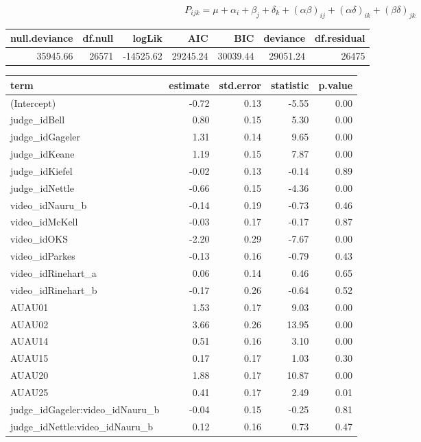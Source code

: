 \documentclass{monashthesis}
\begin{document}
\[P_{ijk} = \mu + \alpha_i + \beta_j +\delta_k + (\alpha\beta)_{ij}+(\alpha\delta)_{ik} + (\beta\delta)_{jk}\]

\begin{tabular}{r|r|r|r|r|r|r}
\hline
null.deviance & df.null & logLik & AIC & BIC & deviance & df.residual\\
\hline
35945.66 & 26571 & -14525.62 & 29245.24 & 30039.44 & 29051.24 & 26475\\
\hline
\end{tabular}

\begin{tabular}{l|r|r|r|r}
\hline
term & estimate & std.error & statistic & p.value\\
\hline
(Intercept) & -0.72 & 0.13 & -5.55 & 0.00\\
\hline
judge\_idBell & 0.80 & 0.15 & 5.30 & 0.00\\
\hline
judge\_idGageler & 1.31 & 0.14 & 9.65 & 0.00\\
\hline
judge\_idKeane & 1.19 & 0.15 & 7.87 & 0.00\\
\hline
judge\_idKiefel & -0.02 & 0.13 & -0.14 & 0.89\\
\hline
judge\_idNettle & -0.66 & 0.15 & -4.36 & 0.00\\
\hline
video\_idNauru\_b & -0.14 & 0.19 & -0.73 & 0.46\\
\hline
video\_idMcKell & -0.03 & 0.17 & -0.17 & 0.87\\
\hline
video\_idOKS & -2.20 & 0.29 & -7.67 & 0.00\\
\hline
video\_idParkes & -0.13 & 0.16 & -0.79 & 0.43\\
\hline
video\_idRinehart\_a & 0.06 & 0.14 & 0.46 & 0.65\\
\hline
video\_idRinehart\_b & -0.17 & 0.26 & -0.64 & 0.52\\
\hline
AUAU01 & 1.53 & 0.17 & 9.03 & 0.00\\
\hline
AUAU02 & 3.66 & 0.26 & 13.95 & 0.00\\
\hline
AUAU14 & 0.51 & 0.16 & 3.10 & 0.00\\
\hline
AUAU15 & 0.17 & 0.17 & 1.03 & 0.30\\
\hline
AUAU20 & 1.88 & 0.17 & 10.87 & 0.00\\
\hline
AUAU25 & 0.41 & 0.17 & 2.49 & 0.01\\
\hline
judge\_idGageler:video\_idNauru\_b & -0.04 & 0.15 & -0.25 & 0.81\\
\hline
judge\_idNettle:video\_idNauru\_b & 0.12 & 0.16 & 0.73 & 0.47\\
\hline

\end{tabular}
\end{document}
